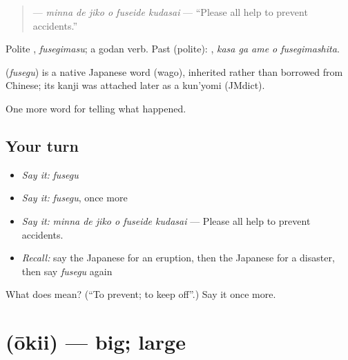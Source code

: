 \begin{quote}
\textbf{   } — \emph{minna de jiko o fuseide kudasai} — \textquotedblleft{}Please all help to prevent accidents.\textquotedblright{}
\end{quote}

Polite \textbf{}, \emph{fusegimasu}; a godan verb. Past (polite): \textbf{  }, \emph{kasa ga ame o fusegimashita}.

\begin{cousinweb}
\textbf{} (\emph{fusegu}) is a native Japanese word (wago), inherited rather than borrowed from Chinese; its kanji was attached later as a kun'yomi (JMdict).
\end{cousinweb}

\begin{grammarlens}[title={What you've built}]
One more word for telling what happened.
\end{grammarlens}

\subsection*{Your turn}
\begin{itemize}
\raggedright
  \item \emph{Say it:} \emph{fusegu}
  \item \emph{Say it:} \emph{fusegu}, once more
  \item \emph{Say it:} \emph{minna de jiko o fuseide kudasai} — Please all help to prevent accidents.
  \item \emph{Recall:} say the Japanese for an eruption, then the Japanese for a disaster, then say \emph{fusegu} again
\end{itemize}

\begin{tcolorbox}[breakable,colback=teal!4,colframe=teal!35!black,title={Before you move on}]
What does  mean? (\textquotedblleft{}To prevent; to keep off\textquotedblright{}.) Say it once more.
\end{tcolorbox}
\section[\texorpdfstring{\ja{おおきい} (ōkii)}{おおきい (ōkii)}]{ (ōkii) — big; large}

\label{lesson:JA-C279-oukii}



